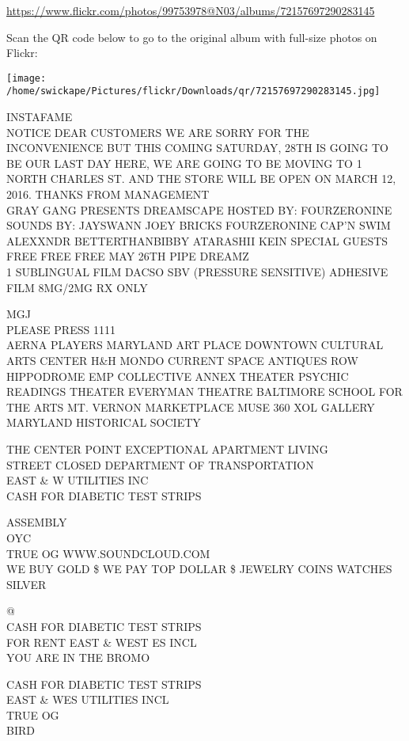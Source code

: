 \documentclass[10pt,letterpaper]{article}
\begin{document}
\url{https://www.flickr.com/photos/99753978@N03/albums/72157697290283145}

Scan the QR code below to go to the original album with full-size photos on Flickr:

\texttt{[image: /home/swickape/Pictures/flickr/Downloads/qr/72157697290283145.jpg]}


INSTAFAME\\
NOTICE DEAR CUSTOMERS WE ARE SORRY FOR THE INCONVENIENCE BUT THIS COMING SATURDAY, 28TH IS GOING TO BE OUR LAST DAY HERE, WE ARE GOING TO BE MOVING TO 1 NORTH CHARLES ST. AND THE STORE WILL BE OPEN ON MARCH 12, 2016.  THANKS FROM MANAGEMENT\\
GRAY GANG PRESENTS DREAMSCAPE HOSTED BY: FOURZERONINE SOUNDS BY: JAYSWANN JOEY BRICKS FOURZERONINE CAP'N SWIM ALEXXNDR BETTERTHANBIBBY ATARASHII KEIN SPECIAL GUESTS FREE FREE FREE MAY 26TH PIPE DREAMZ\\
1 SUBLINGUAL FILM DACSO SBV (PRESSURE SENSITIVE) ADHESIVE FILM 8MG/2MG RX ONLY

MGJ\\
PLEASE PRESS 1111\\
AERNA PLAYERS MARYLAND ART PLACE DOWNTOWN CULTURAL ARTS CENTER H\&H MONDO CURRENT SPACE ANTIQUES ROW\\
HIPPODROME EMP COLLECTIVE ANNEX THEATER PSYCHIC READINGS THEATER EVERYMAN THEATRE BALTIMORE SCHOOL FOR THE ARTS MT. VERNON MARKETPLACE MUSE 360 XOL GALLERY MARYLAND HISTORICAL SOCIETY

THE CENTER POINT EXCEPTIONAL APARTMENT LIVING\\
STREET CLOSED DEPARTMENT OF TRANSPORTATION\\
EAST  \& W UTILITIES INC\\
CASH FOR DIABETIC TEST STRIPS

ASSEMBLY\\
OYC\\
TRUE OG WWW.SOUNDCLOUD.COM\\
WE BUY GOLD \$ WE PAY TOP DOLLAR \$ JEWELRY COINS WATCHES SILVER

@\\
CASH FOR DIABETIC TEST STRIPS\\
FOR RENT EAST \& WEST ES INCL\\
YOU ARE IN THE BROMO

CASH FOR DIABETIC TEST STRIPS\\
EAST \& WES UTILITIES INCL\\
TRUE OG\\
BIRD
\end{document}
